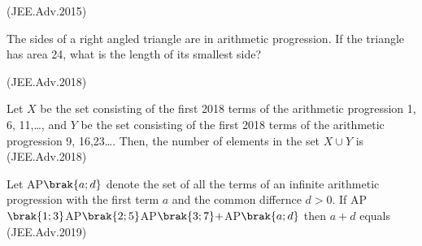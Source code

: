    \hfill(JEE.Adv.2015)

   \item The sides of a right angled triangle are in arithmetic progression. If the triangle has area 24, what is the length of its smallest side? 
   
   \hfill(JEE.Adv.2018)

   \item Let $X$ be the set consisting of the first 2018 terms of the arithmetic progression 1, 6, 11,\dots , and $Y$ be the set consisting of the first 2018 terms of the arithmetic progression 9, 16,23\dots . Then, the number of elements in the set $ X \cup Y $ is \hfill(JEE.Adv.2018)
   \item Let AP$\brak{a;d}$ denote the set of all the terms of an infinite arithmetic progression with the first term $a$ and the common differnce $d>0$. If AP$\brak{1;3}$AP$\brak{2;5}$AP$\brak{3;7}+$AP$\brak{a;d}$ then $a + d$ equals \hfill(JEE.Adv.2019)
   
